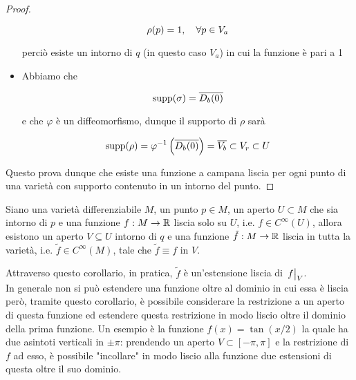 \begin{proof}
\begin{itemize}
		\begin{equation}
			\rho(p) = 1 \qcomma \forall p \in V_{a}
		\end{equation}
	
		perciò esiste un intorno di $ q $ (in questo caso $ V_{a} $) in cui la funzione è pari a 1
		
		
		\item Abbiamo che
		
		\begin{equation}
			\operatorname{supp}(\sigma) = \overline{D_{b}(0)}
		\end{equation}
	
		e che $ \varphi $ è un diffeomorfismo, dunque il supporto di $ \rho $ sarà
		
		\begin{equation}
			\supp(\rho) = \varphi^{-1} \left( \overline{D_{b}(0)} \right) %
			= \overline{V_{b}} \subset V_{r} \subset U
		\end{equation}
	\end{itemize}
	
	Questo prova dunque che esiste una funzione a campana liscia per ogni punto di una varietà con supporto contenuto in un intorno del punto.
\end{proof}

\begin{corollary}\label{cor:ext-smooth}
	Siano una varietà differenziabile $ M $, un punto $ p \in M $, un aperto $ U \subset M $ che sia intorno di $ p $ e una funzione $ f : M \to \mathbb{R} $ liscia solo su $ U $, i.e. $ f \in C^{\infty}(U) $, allora esistono un aperto $ V \subseteq U $ intorno di $ q $ e una funzione $ \tilde{f} : M \to \mathbb{R} $ liscia in tutta la varietà, i.e. $ \tilde{f} \in C^{\infty}(M) $, tale che $ \tilde{f} \equiv f $ in $ V $.
\end{corollary}

Attraverso questo corollario, in pratica, $ \tilde{f} $ è un'estensione liscia di $ \eval{f}_{V} $. \\
In generale non si può estendere una funzione oltre al dominio in cui essa è liscia però, tramite questo corollario, è possibile considerare la restrizione a un aperto di questa funzione ed estendere questa restrizione in modo liscio oltre il dominio della prima funzione. Un esempio è la funzione $ f(x) = \tan(x/2) $ la quale ha due asintoti verticali in $ \pm \pi $: prendendo un aperto $ V \subset [-\pi,\pi] $ e la restrizione di $ f $ ad esso, è possibile "incollare" in modo liscio alla funzione due estensioni di questa oltre il suo dominio.

